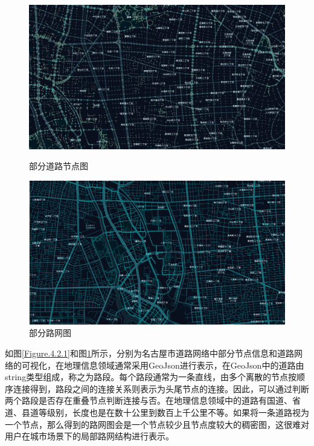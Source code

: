 \documentclass[master]{thesis-uestc}
\begin{document}
\begin{figure}[!ht]
\centering 
\begin{minipage}[b]{0.45\textwidth}
\centering
\includegraphics[scale=0.1]{./pic/node1.png}
\caption{部分道路节点图}
\label{Figure.4.2.1}
\end{minipage}
\begin{minipage}[b]{0.45\textwidth} 
\centering 
\includegraphics[scale=0.1]{./pic/road1.png}
\caption{部分路网图}
\label{Figure.4.2.2}
\end{minipage}
\end{figure}

如图\ref{Figure.4.2.1}和图\ref{Figure.4.2.2}所示，分别为名古屋市道路网络中部分节点信息和道路网络的可视化，在地理信息领域通常采用GeoJson进行表示，在GeoJson中的道路由string类型组成，称之为路段。每个路段通常为一条直线，由多个离散的节点按顺序连接得到，路段之间的连接关系则表示为头尾节点的连接。因此，可以通过判断两个路段是否存在重叠节点判断连接与否。在地理信息领域中的道路有国道、省道、县道等级别，长度也是在数十公里到数百上千公里不等。如果将一条道路视为一个节点，那么得到的路网图会是一个节点较少且节点度较大的稠密图，这很难对用户在城市场景下的局部路网结构进行表示。
\end{document}
